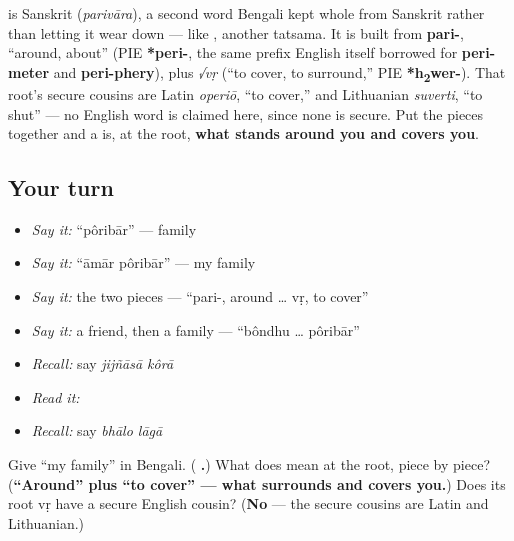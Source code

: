 \begin{cousinweb}
\textbf{} is Sanskrit \textbf{} (\emph{parivāra}), a second word Bengali kept whole from Sanskrit rather than letting it wear down — like , another tatsama. It is built from \textbf{pari-}, \textquotedblleft{}around, about\textquotedblright{} (PIE \textbf{*peri-}, the same prefix English itself borrowed for \textbf{peri-meter} and \textbf{peri-phery}), plus \emph{√vṛ} (\textquotedblleft{}to cover, to surround,\textquotedblright{} PIE \textbf{*h\textsubscript{2}wer-}). That root's secure cousins are Latin \emph{operiō}, \textquotedblleft{}to cover,\textquotedblright{} and Lithuanian \emph{suverti}, \textquotedblleft{}to shut\textquotedblright{} — no English word is claimed here, since none is secure. Put the pieces together and a  is, at the root, \textbf{what stands around you and covers you}.
\end{cousinweb}

\subsection*{Your turn}
\begin{itemize}
\raggedright
  \item \emph{Say it:} \textquotedblleft{}pôribār\textquotedblright{} — family
  \item \emph{Say it:} \textquotedblleft{}āmār pôribār\textquotedblright{} — my family
  \item \emph{Say it:} the two pieces — \textquotedblleft{}pari-, around … vṛ, to cover\textquotedblright{}
  \item \emph{Say it:} a friend, then a family — \textquotedblleft{}bôndhu … pôribār\textquotedblright{}
  \item \emph{Recall:} say \emph{jijñāsā kôrā}
  \item \emph{Read it:} \textbf{ }
  \item \emph{Recall:} say \emph{bhālo lāgā}
\end{itemize}

\begin{tcolorbox}[breakable,colback=teal!4,colframe=teal!35!black,title={Before you move on}]
Give \textquotedblleft{}my family\textquotedblright{} in Bengali. (\textbf{ .}) What does  mean at the root, piece by piece? (\textbf{\textquotedblleft{}Around\textquotedblright{} plus \textquotedblleft{}to cover\textquotedblright{} — what surrounds and covers you.}) Does its root vṛ have a secure English cousin? (\textbf{No} — the secure cousins are Latin and Lithuanian.)
\end{tcolorbox}
